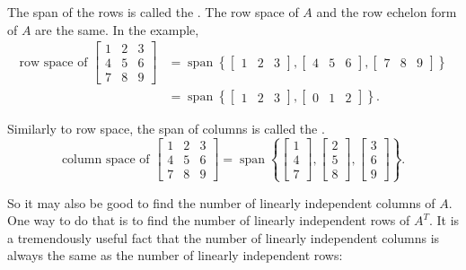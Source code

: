 The span of the rows is called the \emph{}.
The row space of $A$ and the row echelon form of $A$ are the same.
In the example,
\begin{equation*}
\begin{split}
\text{row space of }
\begin{bmatrix}
1 & 2 & 3 \\
4 & 5 & 6 \\
7 & 8 & 9
\end{bmatrix}
& =
\operatorname{span}
\left\{
\begin{bmatrix}
1 & 2 & 3
\end{bmatrix}
,
\begin{bmatrix}
4 & 5 & 6
\end{bmatrix}
,
\begin{bmatrix}
7 & 8 & 9
\end{bmatrix}
\right\}
\\
& =
\operatorname{span}
\left\{
\begin{bmatrix}
1 & 2 & 3
\end{bmatrix}
,
\begin{bmatrix}
0 & 1 & 2
\end{bmatrix}
\right\} .
\end{split}
\end{equation*}

\medskip

Similarly to row space, the span of columns is called the
\emph{}.
\begin{equation*}
\text{column space of }
\begin{bmatrix}
1 & 2 & 3 \\
4 & 5 & 6 \\
7 & 8 & 9
\end{bmatrix}
=
\operatorname{span}
\left\{
\begin{bmatrix}
1 \\ 4 \\ 7
\end{bmatrix}
,
\begin{bmatrix}
2 \\ 5 \\ 8
\end{bmatrix}
,
\begin{bmatrix}
3 \\ 6 \\ 9
\end{bmatrix}
\right\} .
\end{equation*}

So it may also be good to find the number of linearly independent columns
of $A$.  One way to do that is to find the number of linearly independent
rows of $A^T$.  It is a tremendously useful fact that the number of
linearly independent
columns is always the same as the number of linearly independent rows:

